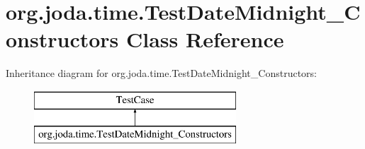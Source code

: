 \hypertarget{classorg_1_1joda_1_1time_1_1_test_date_midnight___constructors}{\section{org.\-joda.\-time.\-Test\-Date\-Midnight\-\_\-\-Constructors Class Reference}
\label{classorg_1_1joda_1_1time_1_1_test_date_midnight___constructors}
}
Inheritance diagram for org.\-joda.\-time.\-Test\-Date\-Midnight\-\_\-\-Constructors\-:\begin{figure}[H]
\begin{center}
\leavevmode
\includegraphics[height=2.000000cm]{classorg_1_1joda_1_1time_1_1_test_date_midnight___constructors}
\end{center}
\end{figure}
